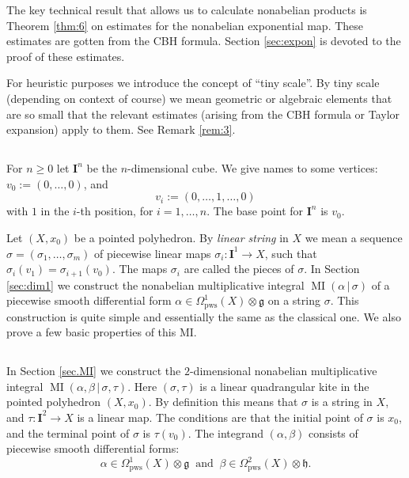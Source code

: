 \documentclass[10pt, a4paper]{amsart}
\theoremstyle{definition}
\numberwithin{equation}{section}
\newcommand{\opn}{\operatorname}
\newcommand{\mfrak}[1]{\mathfrak{#1}}
\newcommand{\mbf}[1]{\mathbf{#1}}
\newcommand{\mrm}[1]{\mathrm{#1}}
\renewcommand{\vert}{\, | \,}
\newcommand{\g}{\mfrak{g}}
\newcommand{\h}{\mfrak{h}}
\begin{document}
The key technical result that allows us to calculate nonabelian products is 
Theorem \ref{thm:6} on estimates for the nonabelian exponential map. These
estimates are gotten from the CBH formula. Section \ref{sec:expon} is devoted
to the proof of these estimates.

For heuristic purposes we introduce the concept of ``tiny scale''. By tiny scale
(depending on context of course) we mean
geometric or algebraic elements that are so small that the relevant estimates
(arising from the CBH formula or Taylor expansion) apply to them. See Remark
\ref{rem:3}.


\subsection{}
For $n \geq 0$ let $\mbf{I}^n$ be the $n$-dimensional cube. We give names 
to some vertices:
$v_0 := (0, \ldots, 0)$, and
\[ v_i := (0, \ldots, 1, \ldots, 0) \]
with $1$ in the $i$-th position, for $i = 1, \ldots, n$.
The base point for $\mbf{I}^n$ is $v_0$. 

Let $(X, x_0)$ be a pointed polyhedron. By {\em linear string} in 
$X$ we mean a sequence
$\sigma = (\sigma_1, \ldots, \sigma_m)$ of 
piecewise linear maps $\sigma_i : \mbf{I}^1 \to X$,
such that $\sigma_i(v_1) = \sigma_{i+1}(v_0)$. 
The maps $\sigma_i$ are called the pieces of $\sigma$. 
In Section \ref{sec:dim1} we construct the nonabelian multiplicative 
integral $\opn{MI}(\alpha \vert \sigma)$
of a piecewise smooth differential form
$\alpha \in \Omega^1_{\mrm{pws}}(X) \otimes \g$
on a string $\sigma$. This construction is quite simple and essentially the
same as the classical one. We also prove a few basic properties of this
MI. 


\subsection{} \label{subsec:binary}
In Section \ref{sec.MI} we construct the $2$-dimensional
nonabelian multiplicative integral
$\opn{MI}(\alpha, \beta \vert \sigma, \tau)$. 
Here $(\sigma, \tau)$ is a linear quadrangular kite in the pointed polyhedron
$(X, x_0)$. By definition this means that $\sigma$ is a string in $X$, and
$\tau : \mbf{I}^2 \to X$ is a linear map. The conditions are that the initial
point of $\sigma$ is $x_0$, and the terminal point of $\sigma$ is 
$\tau(v_0)$. The integrand $(\alpha, \beta)$ consists of piecewise smooth
differential forms:
\[ \alpha \in \Omega^1_{\mrm{pws}}(X) \otimes \g \ \text{ and } \
\beta \in  \Omega^2_{\mrm{pws}}(X) \otimes \h . \]
\end{document}
